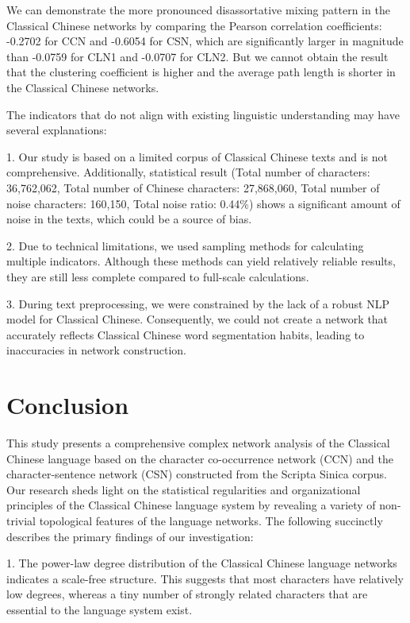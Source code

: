 \documentclass[11pt]{article}
\begin{document}
We can demonstrate the more pronounced disassortative mixing pattern in the Classical Chinese networks by comparing the Pearson correlation coefficients: -0.2702 for CCN and -0.6054 for CSN, which are significantly larger in magnitude than -0.0759 for CLN1 and -0.0707 for CLN2.  But we cannot obtain the result that the clustering coefficient is higher and the average path length is shorter in the Classical Chinese networks. 

The indicators that do not align with existing linguistic understanding may have several explanations:

1. Our study is based on a limited corpus of Classical Chinese texts and is not comprehensive. Additionally, statistical result (Total number of characters: 36,762,062, Total number of Chinese characters: 27,868,060, Total number of noise characters: 160,150, Total noise ratio: 0.44\%) shows a significant amount of noise in the texts, which could be a source of bias.

2. Due to technical limitations, we used sampling methods for calculating multiple indicators. Although these methods can yield relatively reliable results, they are still less complete compared to full-scale calculations.

3. During text preprocessing, we were constrained by the lack of a robust NLP model for Classical Chinese. Consequently, we could not create a network that accurately reflects Classical Chinese word segmentation habits, leading to inaccuracies in network construction.
\section{Conclusion}
This study presents a comprehensive complex network analysis of the Classical Chinese language based on the character co-occurrence network (CCN) and the character-sentence network (CSN) constructed from the Scripta Sinica corpus. Our research sheds light on the statistical regularities and organizational principles of the Classical Chinese language system by revealing a variety of non-trivial topological features of the language networks. The following succinctly describes the primary findings of our investigation:

1. The power-law degree distribution of the Classical Chinese language networks indicates a scale-free structure. This suggests that most characters have relatively low degrees, whereas a tiny number of strongly related characters that are essential to the language system exist.
\end{document}
